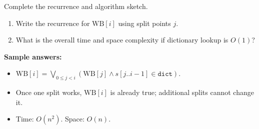 \documentclass[11pt]{article}
\begin{document}
\begin{enumerate}[leftmargin=0pt, itemindent=1.7em, itemsep=1.2em]
Complete the recurrence and algorithm sketch.

\begin{enumerate}[label=(\alph*), leftmargin=2em, itemsep=0.9em]
\item Write the recurrence for $\mathrm{WB}[i]$ using split points $j$.

\vspace{1.2cm}


\item What is the overall time and space complexity if dictionary lookup is $O(1)$?

\vspace{1.0cm}
\end{enumerate}

\ifanswers
\textbf{Sample answers:}
\begin{itemize}
    \item $\mathrm{WB}[i] = \bigvee_{0 \le j < i}\left(\mathrm{WB}[j] \wedge s[j..i-1] \in \texttt{dict}\right)$.
    \item Once one split works, $\mathrm{WB}[i]$ is already true; additional splits cannot change it.
    \item Time: $O(n^2)$. Space: $O(n)$.
\end{itemize}
\fi

\end{enumerate}
\end{document}
